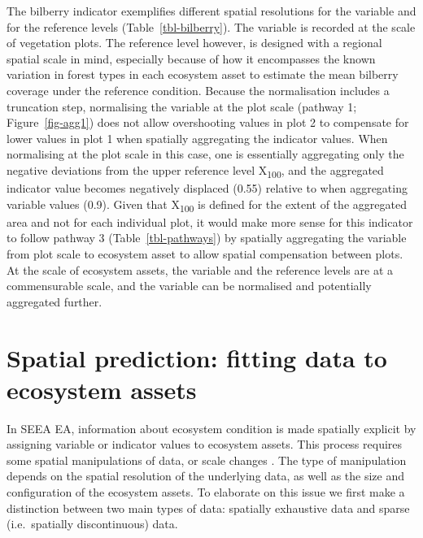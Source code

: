\documentclass[
  authoryear,
  preprint,
  3p]{elsarticle}
\begin{document}
\begin{tcolorbox}[enhanced jigsaw, colback=white, toprule=.15mm, breakable, opacityback=0, arc=.35mm, left=2mm, bottomrule=.15mm, leftrule=.75mm, colframe=quarto-callout-note-color-frame, rightrule=.15mm]
\begin{table}[H]
{}

\end{table}%

The bilberry indicator exemplifies different spatial resolutions for the
variable and for the reference levels (Table~\ref{tbl-bilberry}). The
variable is recorded at the scale of vegetation plots. The reference
level however, is designed with a regional spatial scale in mind,
especially because of how it encompasses the known variation in forest
types in each ecosystem asset to estimate the mean bilberry coverage
under the reference condition. Because the normalisation includes a
truncation step, normalising the variable at the plot scale (pathway 1;
Figure~\ref{fig-agg1}) does not allow overshooting values in plot 2 to
compensate for lower values in plot 1 when spatially aggregating the
indicator values. When normalising at the plot scale in this case, one
is essentially aggregating only the negative deviations from the upper
reference level X\textsubscript{100}, and the aggregated indicator value
becomes negatively displaced (0.55) relative to when aggregating
variable values (0.9). Given that X\textsubscript{100} is defined for
the extent of the aggregated area and not for each individual plot, it
would make more sense for this indicator to follow pathway 3
(Table~\ref{tbl-pathways}) by spatially aggregating the variable from
plot scale to ecosystem asset to allow spatial compensation between
plots. At the scale of ecosystem assets, the variable and the reference
levels are at a commensurable scale, and the variable can be normalised
and potentially aggregated further.

\end{tcolorbox}

\section{Spatial prediction: fitting data to ecosystem
assets}\label{spatial-prediction-fitting-data-to-ecosystem-assets}

In SEEA EA, information about ecosystem condition is made spatially
explicit by assigning variable or indicator values to ecosystem assets.
This process requires some spatial manipulations of data, or scale
changes \citep{ewert2011}. The type of manipulation depends on the
spatial resolution of the underlying data, as well as the size and
configuration of the ecosystem assets. To elaborate on this issue we
first make a distinction between two main types of data: spatially
exhaustive data and sparse (i.e.~spatially discontinuous) data.
\end{document}
